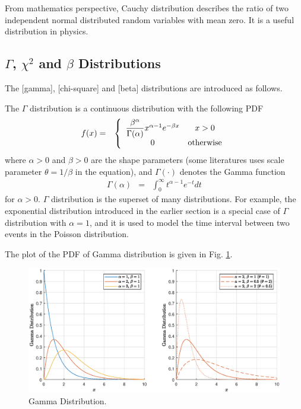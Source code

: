 From mathematics perspective, Cauchy distribution describes the ratio of two independent normal distributed random variables with mean zero. It is a useful distribution in physics.

\subsection{$\Gamma$, $\chi^2$ and $\beta$ Distributions}

The \mync{$\Gamma$}[gamma], [chi-square] and \mync{$\beta$}[beta] distributions are introduced as follows.

The $\Gamma$ distribution is a continuous distribution with the following PDF
\begin{eqnarray}
  f(x) &=& \left\{\begin{array}{cc}
                    \dfrac{\beta^\alpha}{\Gamma(\alpha)}x^{\alpha-1}e^{-\beta x} & x > 0 \\
                    0 & \textup{otherwise}
                  \end{array}\right. \label{eq:gammapdf}
\end{eqnarray}
where $\alpha>0$ and $\beta>0$ are the shape parameters (some literatures uses scale parameter $\theta = 1/\beta$ in the equation), and $\Gamma(\cdot)$ denotes the Gamma function
\begin{eqnarray}
  \Gamma(\alpha) &=& \int_{0}^{\infty}t^{\alpha-1}e^{-t}dt \nonumber
\end{eqnarray}
for $\alpha > 0$. $\Gamma$ distribution is the superset of many distributions. For example, the exponential distribution introduced in the earlier section is a special case of $\Gamma$ distribution with $\alpha=1$, and it is used to model the time interval between two events in the Poisson distribution.

The plot of the PDF of Gamma distribution is given in Fig. \ref{fig:gamma_pdf}.
\begin{figure}
	\centering
	\includegraphics[width=350pt]{chapters/part-1/figures/gamma_pdf.eps}
	\caption{Gamma Distribution.} \label{fig:gamma_pdf}
\end{figure}

